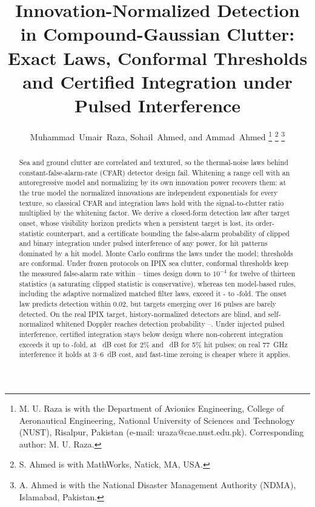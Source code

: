 \documentclass[journal]{IEEEtran}
\begin{document}
\title{Innovation-Normalized Detection in Compound-Gaussian Clutter: Exact Laws, Conformal Thresholds and Certified Integration under Pulsed Interference}

\author{Muhammad~Umair~Raza, Sohail~Ahmed, and Ammad~Ahmed%
\thanks{M. U. Raza is with the Department of Avionics Engineering, College of Aeronautical Engineering, National University of Sciences and Technology (NUST), Risalpur, Pakistan (e-mail: uraza@cae.nust.edu.pk). Corresponding author: M. U. Raza.}%
\thanks{S. Ahmed is with MathWorks, Natick, MA, USA.}%
\thanks{A. Ahmed is with the National Disaster Management Authority (NDMA), Islamabad, Pakistan.}}

\maketitle

\begin{abstract}
Sea and ground clutter are correlated and textured, so the thermal-noise laws behind constant-false-alarm-rate (CFAR) detector design fail. Whitening a range cell with an autoregressive model and normalizing by its own innovation power recovers them: at the true model the normalized innovations are independent exponentials for every texture, so classical CFAR and integration laws hold with the signal-to-clutter ratio multiplied by the whitening factor. We derive a closed-form detection law after target onset, whose visibility horizon predicts when a persistent target is lost, its order-statistic counterpart, and a certificate bounding the false-alarm probability of clipped and binary integration under pulsed interference of any power, for hit patterns dominated by a hit model. Monte Carlo confirms the laws under the model; thresholds are conformal. Under frozen protocols on IPIX sea clutter, conformal thresholds keep the measured false-alarm rate within \LConfMinFour--\LConfMaxFour{} times design down to $10^{-4}$ for twelve of thirteen statistics (a saturating clipped statistic is conservative), whereas ten model-based rules, including the adaptive normalized matched filter laws, exceed it \LAnalMinFour- to \LAnalMaxFour-fold. The onset law predicts detection within 0.02, but targets emerging over 16 pulses are barely detected. On the real IPIX target, history-normalized detectors are blind, and self-normalized whitened Doppler reaches detection probability \TPanmfEight--\TPanmfTwoFiveSix. Under injected pulsed interference, certified integration stays below design where non-coherent integration exceeds it up to \IPfaMaxAll-fold, at \ICertCostTwo~dB cost for 2\% and \ICertCostFive~dB for 5\% hit pulses; on real 77~GHz interference it holds at 3--6~dB cost, and fast-time zeroing is cheaper where it applies.
\end{abstract}
\end{document}
